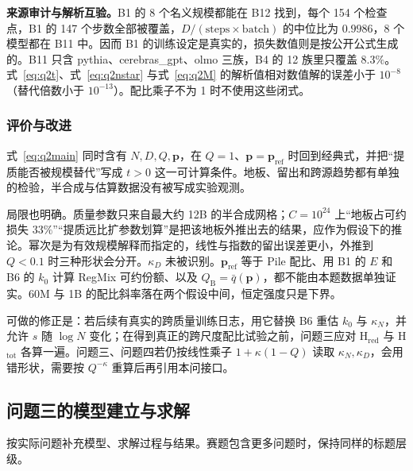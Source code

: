\textbf{来源审计与解析互验。}B1 的 8 个名义规模都能在 B12 找到，每个 154 个检查点，B1 的 147 个步数全部被覆盖，$D/(\mathrm{steps}\times\mathrm{batch})$ 的中位比为 $0.9986$，8 个模型都在 B11 中。因而 B1 的训练设定是真实的，损失数值则是按公开公式生成的。B11 只含 pythia、cerebras\_gpt、olmo 三族，B4 的 12 族里只覆盖 $8.3\%$。式~\eqref{eq:q2t}、式~\eqref{eq:q2nstar} 与式~\eqref{eq:q2M} 的解析值相对数值解的误差小于 $10^{-8}$（替代倍数小于 $10^{-13}$）。配比乘子不为 1 时不使用这些闭式。

\subsubsection{评价与改进}

式~\eqref{eq:q2main} 同时含有 $N,D,Q,\mathbf{p}$，在 $Q=1$、$\mathbf{p}=\mathbf{p}_{\mathrm{ref}}$ 时回到经典式，并把“提质能否被规模替代”写成 $t>0$ 这一可计算条件。地板、留出和跨源趋势都有单独的检验，半合成与估算数据没有被写成实验观测。

局限也明确。质量参数只来自最大约 12B 的半合成网格；$C=10^{24}$ 上“地板占可约损失 $33\%$”“提质远比扩参数划算”是把该地板外推出去的结果，应作为假设下的推论。幂次是为有效规模解释而指定的，线性与指数的留出误差更小，外推到 $Q<0.1$ 时三种形状会分开。$\kappa_D$ 未被识别。$\mathbf{p}_{\mathrm{ref}}$ 等于 Pile 配比、用 B1 的 $E$ 和 B6 的 $k_0$ 计算 RegMix 可约份额、以及 $Q_{\mathrm B}=\bar q(\mathbf{p})$，都不能由本题数据单独证实。60M 与 1B 的配比斜率落在两个假设中间，恒定强度只是下界。

可做的修正是：若后续有真实的跨质量训练日志，用它替换 B6 重估 $k_0$ 与 $\kappa_N$，并允许 $s$ 随 $\log N$ 变化；在得到真正的跨尺度配比试验之前，问题三应对 H$_{\mathrm{red}}$ 与 H$_{\mathrm{tot}}$ 各算一遍。问题三、问题四若仍按线性乘子 $1+\kappa(1-Q)$ 读取 $\kappa_N,\kappa_D$，会用错形状，需要按 $Q^{-\kappa}$ 重算后再引用本问接口。


\subsection{问题三的模型建立与求解}
按实际问题补充模型、求解过程与结果。赛题包含更多问题时，保持同样的标题层级。
